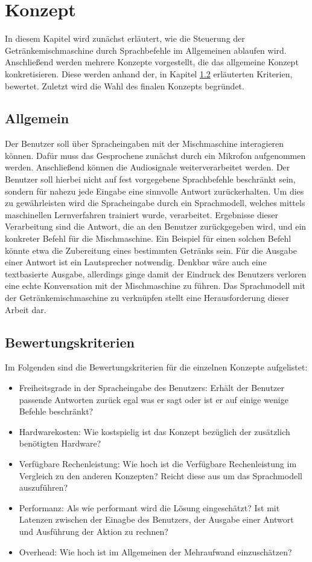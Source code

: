 \chapter{Konzept} \label{chap:konzept}
In diesem Kapitel wird zunächst erläutert, wie die Steuerung der Getränkemischmaschine durch Sprachbefehle im Allgemeinen ablaufen wird.
Anschließend werden mehrere Konzepte vorgestellt, die das allgemeine Konzept konkretisieren.
Diese werden anhand der, in Kapitel \ref{section:Bewertungskriterien} erläuterten Kriterien, bewertet.
Zuletzt wird die Wahl des finalen Konzepts begründet.
\section{Allgemein}
Der Benutzer soll über Spracheingaben mit der Mischmaschine interagieren können.
Dafür muss das Gesprochene zunächst durch ein Mikrofon aufgenommen werden.
Anschließend können die Audiosignale weiterverarbeitet werden.
Der Benutzer soll hierbei nicht auf fest vorgegebene Sprachbefehle beschränkt sein, sondern für nahezu jede Eingabe eine sinnvolle Antwort zurückerhalten.
Um dies zu gewährleisten wird die Spracheingabe durch ein Sprachmodell, welches mittels maschinellen Lernverfahren trainiert wurde, verarbeitet.
Ergebnisse dieser Verarbeitung sind die Antwort, die an den Benutzer zurückgegeben wird, und ein konkreter Befehl für die Mischmaschine.
Ein Beispiel für einen solchen Befehl könnte etwa die Zubereitung eines bestimmten Getränks sein.
Für die Ausgabe einer Antwort ist ein Lautsprecher notwendig.
Denkbar wäre auch eine textbasierte Ausgabe, allerdings ginge damit der Eindruck des Benutzers verloren eine echte Konversation mit der Mischmaschine zu führen.
Das Sprachmodell mit der Getränkemischmaschine zu verknüpfen stellt eine Herausforderung dieser Arbeit dar.
\section{Bewertungskriterien} \label{section:Bewertungskriterien}
Im Folgenden sind die Bewertungskriterien für die einzelnen Konzepte aufgelistet:
\begin{itemize}
    \item Freiheitsgrade in der Spracheingabe des Benutzers: Erhält der Benutzer passende Antworten zurück egal was er sagt oder ist er auf einige wenige Befehle beschränkt?
    \item Hardwarekosten: Wie kostspielig ist das Konzept bezüglich der zusätzlich benötigten Hardware?
    \item Verfügbare Rechenleistung: Wie hoch ist die Verfügbare Rechenleistung im Vergleich zu den anderen Konzepten? Reicht diese aus um das Sprachmodell auszuführen?
    \item Performanz: Als wie performant wird die Lösung eingeschätzt? Ist mit Latenzen zwischen der Einagbe des Benutzers, der Ausgabe einer Antwort und Ausführung der Aktion zu rechnen?
    \item Overhead: Wie hoch ist im Allgemeinen der Mehraufwand einzuschätzen?
\end{itemize}
